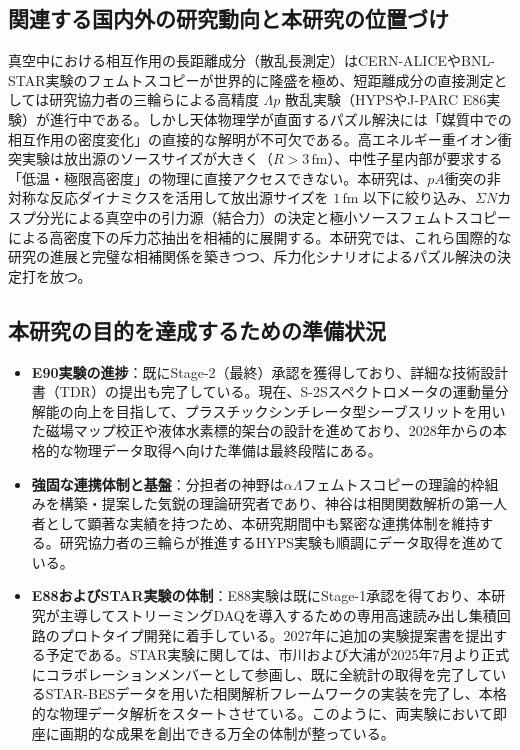 \documentclass[11pt,a4j,dvipdfmx]{jarticle} 					%
\newcommand{\研究課題名}{加速器実験による短距離バリオン間相互作用の解明と中性子星ハイペロンパズルの解決}
\newcommand{\研究機関名}{東北大学}
\newcommand{\研究代表者氏名}{市川裕大}
\newcommand{\研究期間の最終元号年度}{13}
\begin{document}
\subsection{関連する国内外の研究動向と本研究の位置づけ}
真空中における相互作用の長距離成分（散乱長測定）はCERN-ALICEやBNL-STAR実験のフェムトスコピーが世界的に隆盛を極め、短距離成分の直接測定としては研究協力者の三輪らによる高精度 $\Lambda p$ 散乱実験（HYPSやJ-PARC E86実験）が進行中である。しかし天体物理学が直面するパズル解決には「媒質中での相互作用の密度変化」の直接的な解明が不可欠である。高エネルギー重イオン衝突実験は放出源のソースサイズが大きく（$R > 3\,\text{fm}$）、中性子星内部が要求する「低温・極限高密度」の物理に直接アクセスできない。本研究は、$pA$衝突の非対称な反応ダイナミクスを活用して放出源サイズを $1\,\text{fm}$ 以下に絞り込み、$\Sigma N$カスプ分光による真空中の引力源（結合力）の決定と極小ソースフェムトスコピーによる高密度下の斥力芯抽出を相補的に展開する。本研究では、これら国際的な研究の進展と完璧な相補関係を築きつつ、斥力化シナリオによるパズル解決の決定打を放つ。

\subsection{本研究の目的を達成するための準備状況}

\begin{itemize}
    \item \textbf{E90実験の進捗}：既にStage-2（最終）承認を獲得しており、詳細な技術設計書（TDR）の提出も完了している。現在、S-2Sスペクトロメータの運動量分解能の向上を目指して、プラスチックシンチレータ型シーブスリットを用いた磁場マップ校正や液体水素標的架台の設計を進めており、2028年からの本格的な物理データ取得へ向けた準備は最終段階にある。
    \item \textbf{強固な連携体制と基盤}：分担者の神野は$\alpha\Lambda$フェムトスコピーの理論的枠組みを構築・提案した気鋭の理論研究者であり、神谷は相関関数解析の第一人者として顕著な実績を持つため、本研究期間中も緊密な連携体制を維持する。研究協力者の三輪らが推進するHYPS実験も順調にデータ取得を進めている。
    \item \textbf{E88およびSTAR実験の体制}：E88実験は既にStage-1承認を得ており、本研究が主導してストリーミングDAQを導入するための専用高速読み出し集積回路のプロトタイプ開発に着手している。2027年に追加の実験提案書を提出する予定である。STAR実験に関しては、市川および大浦が2025年7月より正式にコラボレーションメンバーとして参画し、既に全統計の取得を完了しているSTAR-BESデータを用いた相関解析フレームワークの実装を完了し、本格的な物理データ解析をスタートさせている。このように、両実験において即座に画期的な成果を創出できる万全の体制が整っている。
\end{itemize}
\end{document}
